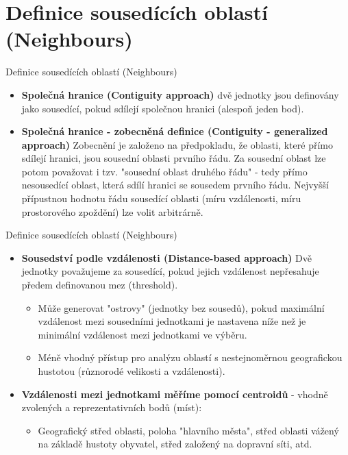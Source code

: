 \documentclass{beamer}
\begin{document}
\section{Definice sousedících oblastí (Neighbours)}
\begin{frame}{Definice sousedících oblastí (Neighbours)}
\begin{itemize}
\item \textbf{Společná hranice (Contiguity approach)} dvě jednotky jsou definovány jako sousedící, pokud sdílejí společnou hranici (alespoň jeden bod). 	
\item \textbf{Společná hranice - zobecněná definice (Contiguity - generalized approach)}  Zobecnění je založeno na předpokladu, že oblasti, které přímo sdílejí hranici, jsou sousední oblasti prvního řádu. Za sousední oblast lze potom považovat i tzv. "sousední oblast druhého řádu" - tedy přímo nesousedící oblast, která sdílí hranici se sousedem prvního řádu. Nejvyšší přípustnou hodnotu řádu sousedící oblasti (míru vzdálenosti, míru prostorového zpoždění) lze volit arbitrárně.	
\end{itemize}
\end{frame}
\begin{frame}{Definice sousedících oblastí (Neighbours)}
\begin{itemize}
	\item \textbf{Sousedství podle vzdálenosti (Distance-based approach)} Dvě jednotky považujeme za sousedící, pokud jejich vzdálenost nepřesahuje předem definovanou mez (threshold). 
	\begin{itemize}
		\item Může generovat "ostrovy" (jednotky bez sousedů), pokud maximální vzdálenost mezi sousedními jednotkami je nastavena níže než je minimální vzdálenost mezi jednotkami ve výběru. 
		\item Méně vhodný přístup pro analýzu oblastí s nestejnoměrnou geografickou hustotou (různorodé velikosti a vzdálenosti). 
	\end{itemize}
	\item \textbf{Vzdálenosti mezi jednotkami měříme pomocí centroidů} - vhodně zvolených a reprezentativních bodů (míst):  
	\begin{itemize}
		\item Geografický střed oblasti, poloha  "hlavního města", střed oblasti vážený na základě hustoty obyvatel, střed založený na dopravní síti, atd.
	\end{itemize}
\end{itemize}
\end{frame}
\end{document}
